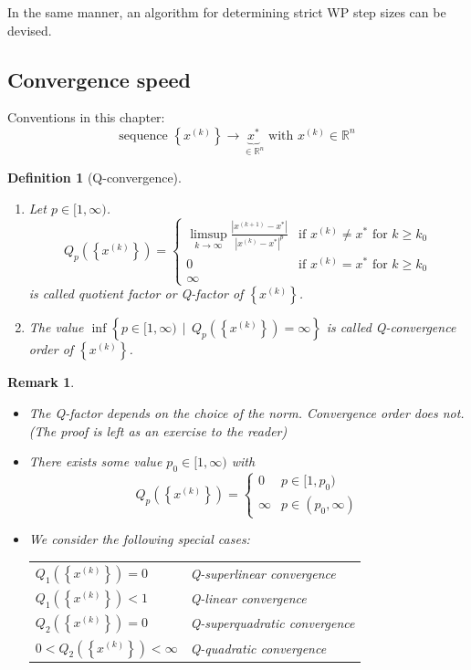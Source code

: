 \documentclass[a4paper]{article}
\numberwithin{lecref}{subsection}
\newtheorem*{Definition}{Definition}
\newtheorem*{Remark}{Remark}
\newcommand{\Abs}[1]{\left|#1\right|}
\newcommand{\Set}[1]{\left\{#1\right\}}
\newcommand{\SetDef}[2]{\left\{#1\,\mid\,#2\right\}}
\begin{document}
In the same manner, an algorithm for determining strict WP step sizes can be devised.

\subsection{Convergence speed}
\label{section:5}

Conventions in this chapter:
\[ \text{sequence } \Set{x^{(k)}} \to \underbrace{x^*}_{\in \mathbb R^n} \text{ with } x^{(k)} \in \mathbb R^n \]

\begin{Definition}[Q-convergence]
	\begin{enumerate}
		\item 
			Let $p \in [1, \infty)$. 
			\[
				Q_p\left(\Set{x^{(k)}}\right) = \begin{cases}
					\limsup_{k \to \infty} \frac{\Abs{x^{(k+1)} - x^*}}{\Abs{x^{(k)} - x^*}^p} & \text{if } x^{(k)} \neq x^* \text{ for } k \geq k_0 \\
					0 & \text{if } x^{(k)} = x^* \text{ for } k \geq k_0 \\
					\infty &
				\end{cases}
			\]
			is called \emph{quotient factor} or \emph{Q-factor} of $\Set{x^{(k)}}$.
		\item The value $\inf\SetDef{p \in [1, \infty)}{Q_p(\Set{x^{(k)}}) = \infty}$ is called Q-convergence order of $\Set{x^{(k)}}$.
	\end{enumerate}
\end{Definition}

\begin{Remark}
	\begin{itemize}
		\item The Q-factor depends on the choice of the norm. Convergence order does not. (The proof is left as an exercise to the reader)
		\item There exists some value $p_0 \in [1, \infty)$ with
			\[ Q_p(\Set{x^{(k)}}) = \begin{cases} 0 & p \in [1, p_0) \\ \infty & p \in (p_0, \infty) \end{cases} \]
		\item We consider the following special cases:

			\begin{center}
				\begin{tabular}{ll}
					$Q_1\left(\Set{x^{(k)}}\right) = 0$ & Q-superlinear convergence \\
					$Q_1\left(\Set{x^{(k)}}\right) < 1$ & Q-linear convergence \\
					$Q_2\left(\Set{x^{(k)}}\right) = 0$ & Q-superquadratic convergence \\
					$0 < Q_2\left(\Set{x^{(k)}}\right) < \infty$ & Q-quadratic convergence
				\end{tabular}
			\end{center}
	\end{itemize}
\end{Remark}
\end{document}
